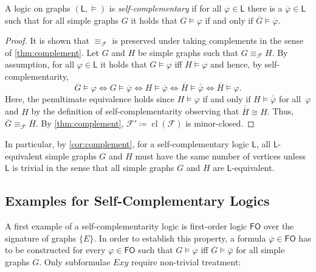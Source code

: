 \documentclass[3p,final]{elsarticle}
\renewcommand\phi\varphi
\DeclareMathOperator{\cl}{cl}
\begin{document}
	\begin{definition} \label{def:self-complementary}
		A logic on graphs $(\mathsf{L}, \models)$ is \emph{self-complementary} if for all 		
		$\phi \in \mathsf{L}$ there is a $\overline{\phi} \in \mathsf{L}$ such that
		for all simple graphs $G$ it holds that $G  \models \phi$ if and only if $ \overline{G} \models \overline{\phi}$.
	\end{definition}
	
	\thmLogic*
	
	
	\begin{proof}It is shown that $\equiv_{\mathcal{F}}$ is preserved under taking complements in the sense of \cref{thm:complement}.
		Let $G$ and $H$ be simple graphs such that $G \equiv_{\mathcal{F}} H$. By assumption, for all $\phi \in \mathsf{L}$ it holds that $G \models \phi$ iff $H \models \phi$ and hence, by self-complementarity,
		\[
		\overline{G} \models \phi 
		\iff
		G \models \overline{\phi}
		\iff
		H \models \overline{\phi}
		\iff
		\overline{H} \models \overline{\overline{\phi}}
		\iff
		\overline{H} \models \phi.
		\]
		Here, the penultimate equivalence holds since $H \models \phi$ if and only if $H \models \overline{\overline{\phi}}$ for all~$\phi$ and $H$ by the definition of self-complementarity observing that $\overline{\overline{H}} \cong H$.
		Thus, $\overline{G} \equiv_{\mathcal{F}} \overline{H}$.
		By \cref{thm:complement}, $\mathcal{F}' \coloneqq \cl(\mathcal{F})$ is minor-closed.
	\end{proof}
	

	In particular, by \cref{cor:complement}, 
	for a self-complementary logic $\mathsf{L}$,
	all $\mathsf{L}$-equivalent simple graphs $G$ and $H$ must have the same number of vertices unless $\mathsf{L}$ is trivial in the sense that all simple graphs $G$ and $H$ are $\mathsf{L}$-equivalent.

	\subsection{Examples for Self-Complementary Logics}
	A first example of a self-complementarity logic is first-order logic $\mathsf{FO}$ over the signature of graphs $\{E\}$.
	In order to establish this property, 
	a formula $\overline{\phi} \in \mathsf{FO}$ has to be constructed for every $\phi \in \mathsf{FO}$ such that $G \models \phi$ iff $\overline{G} \models \overline{\phi}$ for all simple graphs $G$. Only subformulae $Exy$ require non-trivial treatment:
	
\end{document}
